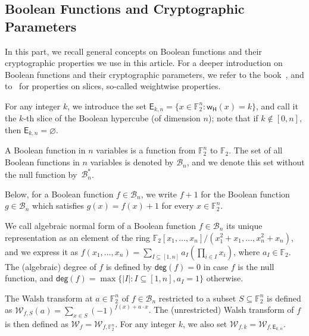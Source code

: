 \documentclass[runningheads,orivec]{llncs}
\newcommand{\BN}{\mathcal{B}_n}
\newcommand{\degg}{\mathsf{deg}}
\newcommand{\Ekn}[2]{\mathsf{E}_{#1,#2}}
\newcommand{\F}{\mathbb{F}}
\newcommand{\w}{\mathsf{w_H}}
\newcommand{\wt}[1]{\mathcal W_{#1}}
\begin{document}
    \subsection{Boolean Functions and Cryptographic Parameters}
    
    In this part, we recall general concepts on Boolean functions and their cryptographic properties we use in this article. For a deeper introduction on Boolean functions and their cryptographic parameters, we refer to the book~\cite{Carlet20}, and to~\cite{TOSC:CarMeaRot17} for properties on slices, so-called weightwise properties.
    
    \begin{definition}[Slice]
        For any integer $k$, we introduce the set $\Ekn{k}{n}=\{x\in \F_2^n:\w(x)=k\}$, and call it the $k$-th slice of the Boolean hypercube (of dimension $n$); note that if $k\not\in[0,n]$, then $\Ekn kn=\varnothing$.
    \end{definition}
    
    \begin{definition}\label{def:bool_f}
    	A Boolean function in $n$ variables is a function from $\F_2^n$ to $\F_2$. The set of all Boolean functions in $n$ variables is denoted by $\BN$, and we denote this set without the null function by~$\BN^*$.
    \end{definition}
    
    Below, for a Boolean function $f\in\BN$, we write $f+1$ for the Boolean function $g\in\BN$ which satisfies $g(x)=f(x)+1$ for every $x\in\F_2^n$.
    
    \begin{definition}\label{def:anf}
    	We call algebraic normal form of a Boolean function $f\in\BN$ its unique representation as an element of the ring $\F_2[x_1,\dots,x_n]/(x_1^2+x_1,\dots,x_n^2+x_n)$, and we express it as $f(x_1,\dots,x_n)= \sum_{I \subseteq [1,n]} a_I \left( \prod_{i \in I} x_i \right)$, where $a_I\in \F_2$. The (algebraic) degree of $f$ is defined by $\degg(f)=0$ in case $f$ is the null function, and $\degg(f)=\max\{ |I|:I\subseteq[1,n],a_I=1\}$ otherwise.
    \end{definition}
    
    \begin{definition}\label{def:walsh_transform}
    	The Walsh transform at $a \in \F_2^n$ of $f\in\BN$ restricted to a subset $S\subseteq \F_2^n$ is defined as $\wt{f,S} (a) = \sum_{x\in S} (-1)^{f(x)+a\cdot x}$. The (unrestricted) Walsh transform of $f$ is then defined as $\wt{f}=\wt{f,\F_2^n}$. For any integer $k$, we also set $\wt{f,k}=\wt{f,\Ekn{k}{n}}$.
    \end{definition}
    
\end{document}
